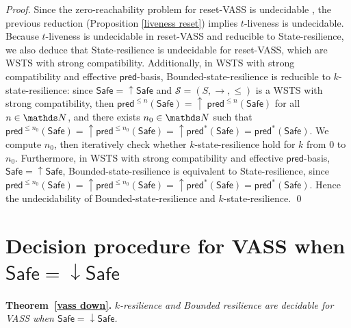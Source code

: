 \documentclass[runningheads]{llncs}
\newcommand{\mathieu}[1]{\todo[inline,color=blue!20]{{\bf MH:} #1}}
\newcommand{\pred}{\textsf{pred}}
\newcommand{\Safe}{\textsf{Safe}}
\begin{document}
\begin{proof}
Since the zero-reachability problem for reset-VASS is undecidable \cite{dufourd1998reset}, the previous reduction (Proposition \ref{liveness reset}) implies 
{\sc $t$-liveness} is undecidable.
Because
{\sc $t$-liveness} is undecidable in reset-VASS
and reducible to {\sc State-resilience}, we also deduce that {\sc State-resilience} is undecidable for reset-VASS, which are WSTS with strong compatibility.
Additionally, in WSTS with strong compatibility and effective $\pred$-basis, {\sc Bounded-state-resilience} is
reducible to {\sc $k$-state-resilience}:
since $\Safe=\mathop{\uparrow} \Safe$ and
$\mathscr{S}=(S,\rightarrow,\leq)$ is a WSTS with strong 
compatibility, then $\pred^{\leq n}(\Safe)= \mathop{\uparrow}~\pred^{\leq n}(\Safe)$ for all $n \in \N$,
and there exists $n_0 \in \N$ such that 
$\pred^{\leq n_0}(\Safe) = \mathop{\uparrow} \pred^{\leq n_0}(\Safe) = \mathop{\uparrow} \pred^*(\Safe) = \pred^*(\Safe)$.
We compute 
$n_0$, then iteratively check whether $k$-state-resilience 
hold for $k$ from $0$ to $n_0$.  
Furthermore, in WSTS with strong compatibility and effective $\pred$-basis,  $\Safe=\mathop{\uparrow} \Safe$, {\sc Bounded-state-resilience} is equivalent to {\sc State-resilience},
since 
$\pred^{\leq n_0}(\Safe) = \mathop{\uparrow} \pred^{\leq n_0}(\Safe) = {\mathop{\uparrow} \pred^*(\Safe)} = \pred^*(\Safe)$.
Hence the undecidability of {\sc Bounded-state-resilience}
and 
 {\sc $k$-state-resilience}. \qed
\end{proof}


\section{Decision procedure for VASS when $\Safe = \mathop{\downarrow} \Safe$}\label{appendix vass}




\noindent
\textbf{Theorem~\ref{vass down}.}
{\em {\sc $k$-resilience }  and {\sc Bounded resilience} are decidable for VASS when 
$\Safe = \mathop{\downarrow} \Safe$.
}
\end{document}
